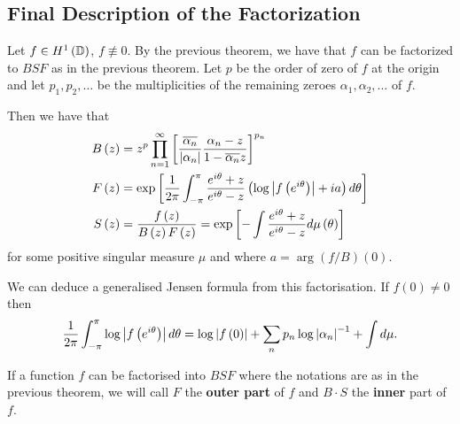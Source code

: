 \subsection{Final Description of the Factorization}
Let $f\in H^{1} \left( \mathbb D \right)$, $f\not\equiv 0$. By the previous theorem, we have that $f$ can be factorized to $BSF$ as in the previous theorem. Let $p$ be the order of zero of $f$ at the origin and let $p_{1}, p_{2}, \ldots$ be the multiplicities of the remaining zeroes $\alpha_{1}, \alpha_{2}, \ldots$ of $f$. 

Then we have that
\begin{align*}
    B\left( z \right) &= z^{p} \prod_{n=1}^{\infty} \left[ \frac{\overline{\alpha_{n}}}{\left\lvert \alpha_{n} \right\rvert} \frac{\alpha_{n} - z}{ 1- \overline{\alpha_{n}}z} \right]^{p_{n}} \\
    F\left( z \right) &=  \exp \left[ \frac{1}{2\pi} \int_{-\pi}^{\pi} \frac{e^{i\theta} + z}{ e^{i\theta} -z} \left( \log \left\lvert f\left( e^{i\theta} \right) \right\rvert + ia \right) d\theta \right]  \\
    S\left( z \right) &= \frac{f\left( z \right)}{B\left( z \right) F\left( z \right)} = \exp \left[ -\int \frac{e^{i\theta} +z}{ e^{i\theta} - z} d\mu \left( \theta \right) \right]
\end{align*}
for some positive singular measure $\mu$ and where $a= \arg \left( f/B \right) \left( 0 \right)$.

We can deduce a generalised Jensen formula from this factorisation. If $f\left( 0 \right) \ne 0$ then 
\begin{equation*}
    \frac{1}{2\pi} \int_{-\pi}^{\pi} \log \left\lvert f\left( e^{i\theta} \right) \right\rvert d\theta = \log \left\lvert f\left( 0 \right) \right\rvert + \sum_{n} p_{n} \log \left\lvert \alpha_{n} \right\rvert^{-1} + \int d\mu.
\end{equation*}

\begin{definition}
    If a function $f$ can be factorised into $BSF$ where the notations are as in the previous theorem, we will call $F$ the \textbf{outer part} of $f$ and $B\cdot S$ the \textbf{inner} part of $f$.
    \label{def:inner-and-outer-part-of-a-function}
\end{definition}

